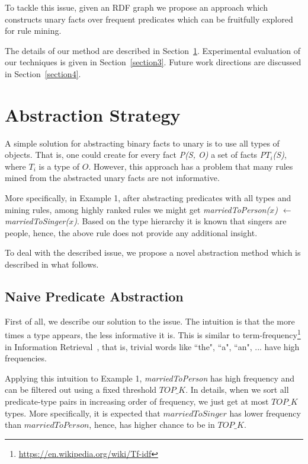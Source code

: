 To tackle this issue, given an RDF graph we propose an approach which constructs unary facts over frequent predicates which can be fruitfully explored for rule mining.

The details of our method are described in Section~\ref{section2}. Experimental evaluation of our techniques is given in Section~\ref{section3}. Future work directions are discussed in Section~\ref{section4}.

\section{Abstraction Strategy}
\label{section2}

A simple solution for abstracting binary facts to unary is to use all types of objects. That is, one could create for every fact \textit{P(S, O)} a set of facts \textit{P$T_{i}$(S)}, where \textit{$T_{i}$} is a type of $O$. However, this approach has a problem that many rules mined from the abstracted unary facts are not informative.

More specifically, in Example 1, after abstracting predicates with all types and mining rules, among highly ranked rules we might get \textit{marriedToPerson($x$) $\leftarrow$ marriedToSinger($x$)}. Based on the type hierarchy it is known that singers are people, hence, the above rule does not provide any additional insight.

To deal with the described issue, we propose a novel abstraction method which is described in what follows.

\subsection{Naive Predicate Abstraction}
\label{section21}

First of all, we describe our solution to the issue. The intuition is that the more times a type appears, the less informative it is. This is similar to term-frequency\footnote{\url{https://en.wikipedia.org/wiki/Tf-idf}} in Information Retrieval~\cite{ref2}, that is, trivial words like ``the", ``a", ``an", ... have high frequencies.

Applying this intuition to Example 1, \textit{marriedToPerson} has high frequency and can be filtered out using a fixed threshold $TOP\_K$. In details, when we sort all predicate-type pairs in increasing order of frequency, we just get at most $TOP\_K$ types. More specifically, it is expected that $marriedToSinger$ has lower frequency than $marriedToPerson$, hence, has higher chance to be in $TOP\_K$.

